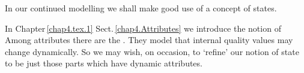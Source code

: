 \label{lect2.label.analysis}


\label{A Part State}\label{kap3.States.general}\label{lect2.label.synthesis} 

\begynd
\pind In our continued modelling
\begynd
\pind we shall make good use of a concept of states.
\afslut
\afslut

\pos{\vspace*{2mm}}{\vspace*{2cm}}

\noindent%
\pos{\psno}{\mnewfoil}%
\begynd%
\pind In Chapter\,\ref{chap4.tex.1} Sect.\,\ref{chap4.Attributes} \nyl
we introduce the notion of \sfsl{attributes.} 
\begynd
\pind Among attributes there are the .
\pind They model that internal \ysf{} quality values \nyl  may change dynamically.
\pind So we may wish, on occasion, to `refine' our notion of state
      \nyl to be just those parts which have dynamic attributes.
\afslut
\afslut

